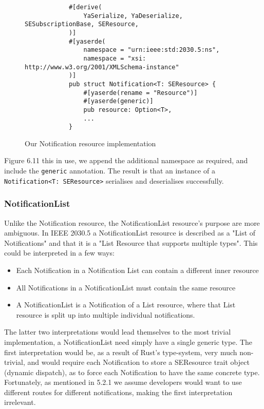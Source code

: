 \begin{figure}[H]
    \begin{center}
        \begin{lstlisting}
            #[derive(
                YaSerialize, YaDeserialize, SESubscriptionBase, SEResource,
            )]
            #[yaserde(
                namespace = "urn:ieee:std:2030.5:ns",
                namespace = "xsi: http://www.w3.org/2001/XMLSchema-instance"
            )]
            pub struct Notification<T: SEResource> {
                #[yaserde(rename = "Resource")]
                #[yaserde(generic)]
                pub resource: Option<T>,
                ...
            }    
        \end{lstlisting}
        \label{fig:notifimpl}
        \caption{Our Notification resource implementation}
    \end{center}
\end{figure}

Figure 6.11 this in use, we append the additional namespace as required, and include the \texttt{generic} annotation. The result is that an instance of a \texttt{Notification<T: SEResource>} serialises and deserialises successfully. 


\subsubsection{NotificationList}
Unlike the Notification resource, the NotificationList resource's purpose are more ambiguous. In IEEE 2030.5 a NotificationList resource is described as a "List of Notifications" and that it is a "List Resource that supports multiple types". This could be interpreted in a few ways:

\begin{itemize}
    \item Each Notification in a Notification List can contain a different inner resource
    \item All Notifications in a NotificationList must contain the same resource
    \item A NotificationList is a Notification of a List resource, where that List resource is split up into multiple individual notifications.
\end{itemize}

The latter two interpretations would lead themselves to the most trivial implementation, a NotificationList need simply have a single generic type. The first interpretation would be, as a result of Rust's type-system, very much non-trivial, and would require each Notification to store a SEResource trait object (dynamic dispatch), as to force each Notification to have the same concrete type.
Fortunately, as mentioned in 5.2.1 we assume developers would want to use different routes for different notifications, making the first interpretation irrelevant.

